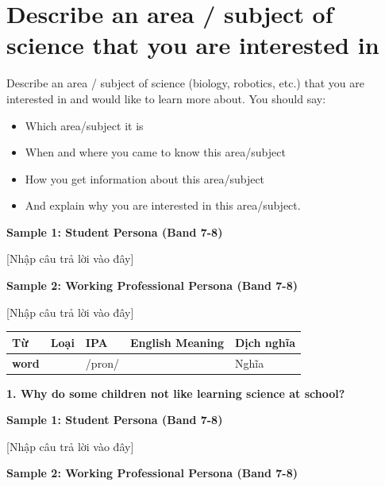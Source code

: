 \section{Describe an area / subject of science that you are interested in}
\begin{ieltsprompt}
Describe an area / subject of science (biology, robotics, etc.) that you are interested in and would like to learn more about.
You should say:
\begin{itemize}[leftmargin=2em, itemsep=2pt]
\item Which area/subject it is
\item When and where you came to know this area/subject
\item How you get information about this area/subject
\item And explain why you are interested in this area/subject.
\end{itemize}
\end{ieltsprompt}
\begin{ieltsanswer}
\textbf{Sample 1: Student Persona (Band 7-8)}

[Nhập câu trả lời vào đây]

\textbf{Sample 2: Working Professional Persona (Band 7-8)}

[Nhập câu trả lời vào đây]
\end{ieltsanswer}


\vspace{0.8em}
\begin{center}
\renewcommand{\arraystretch}{1.65}
\begin{tabularx}{\textwidth}{|V{0.22\textwidth}|C{0.07\textwidth}|I{0.20\textwidth}|Y|V{0.18\textwidth}|}
\hline
{}
\textbf{Từ} & \textbf{Loại} & \textbf{IPA} & \textbf{English Meaning} & \textbf{Dịch nghĩa} \\
\hline
\textbf{word} & & /pron/ & & Nghĩa \\ \hline
\end{tabularx}
\end{center}

\partthreeheader

\begin{ieltsquestion}
\textbf{1. Why do some children not like learning science at school?}
\end{ieltsquestion}
\textbf{Sample 1: Student Persona (Band 7-8)}

[Nhập câu trả lời vào đây]

\textbf{Sample 2: Working Professional Persona (Band 7-8)}

